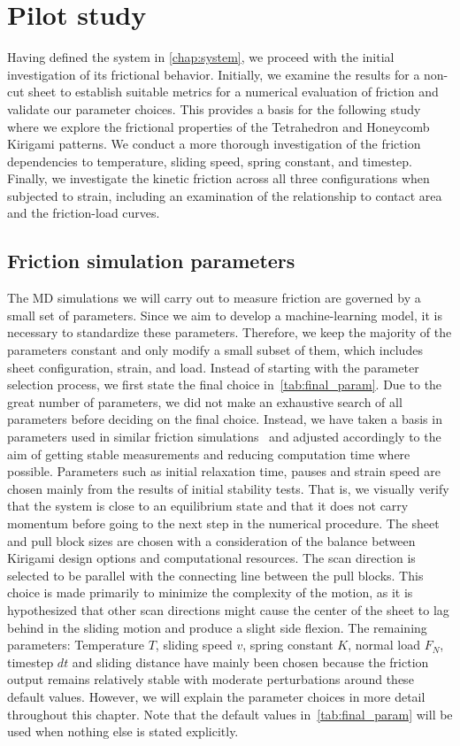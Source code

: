 \chapter{Pilot study}\label{chap:pilot_study}
Having defined the system in \cref{chap:system}, we proceed with the initial investigation of its frictional behavior. Initially, we examine the results for a non-cut sheet to establish suitable metrics for a numerical evaluation of friction and validate our parameter choices. This provides a basis for the following study where we explore the frictional properties of the Tetrahedron and Honeycomb Kirigami patterns. We conduct a more thorough investigation of the friction dependencies to temperature, sliding speed, spring constant, and timestep. Finally, we investigate the kinetic friction across all three configurations when subjected to strain, including an examination of the relationship to contact area and the friction-load curves.


\section{Friction simulation parameters}
The \acrshort{MD} simulations we will carry out to measure friction are governed
by a small set of parameters. Since we aim to develop a machine-learning model,
it is necessary to standardize these parameters. Therefore, we keep the majority
of the parameters constant and only modify a small subset of them, which
includes sheet configuration, strain, and load. Instead of starting with the
parameter selection process, we first state the final choice
in~\cref{tab:final_param}. Due to the great number of parameters, we did not
make an exhaustive search of all parameters before deciding on the final choice.
Instead, we have taken a basis in parameters used in similar friction
simulations~\cite{li_evolving_2016, Yoon2015MolecularDS, liu_high-speed_2014,
zhu_study_2018, ma12091425} and adjusted accordingly to the aim of getting
stable measurements and reducing computation time where possible. Parameters
such as initial relaxation time, pauses and strain speed are chosen mainly from
the results of initial stability tests. That is, we visually verify that the
system is close to an equilibrium state and that it does not carry momentum
before going to the next step in the numerical procedure. The sheet and pull
block sizes are chosen with a consideration of the balance between Kirigami
design options and computational resources. The scan direction is selected to be
parallel with the connecting line between the pull blocks. This choice is made
primarily to minimize the complexity of the motion, as it is hypothesized that
other scan directions might cause the center of the sheet to lag behind in the sliding motion and
produce a slight side flexion. The remaining
parameters: Temperature $T$, sliding speed $v$, spring constant
$K$, normal load $F_N$, timestep $dt$ and sliding distance have mainly been chosen
because the friction output remains relatively stable with moderate
perturbations around these default values. However, we will explain the parameter choices in more detail throughout this chapter. Note that the default values in~\cref{tab:final_param}
will be used when nothing else is stated explicitly.


